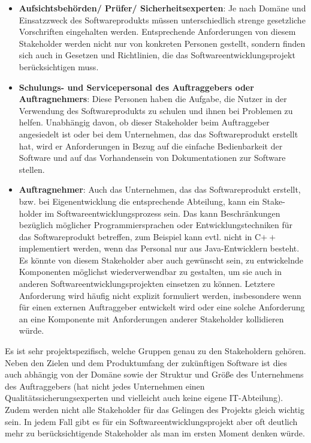 \begin{itemize}
	\item \textbf{Aufsichtsbehörden/ Prüfer/ Sicherheitsexperten}: Je nach Domäne und Einsatzzweck des Softwareprodukts müssen unterschiedlich strenge gesetzliche Vorschriften eingehalten werden. Entsprechende Anforderungen von diesem Stakeholder werden nicht nur von konkreten Personen gestellt, sondern finden sich auch in Gesetzen und Richtlinien, die das Softwareentwicklungsprojekt berücksichtigen muss.
	\item \textbf{Schulungs- und Servicepersonal des Auftraggebers oder Auftrag\-nehmers}: Diese Personen haben die Aufgabe, die Nutzer in der Verwendung des Softwareprodukts zu schulen und ihnen bei Problemen zu helfen. Unabhängig davon, ob dieser Stakeholder beim Auftraggeber angesiedelt ist oder bei dem Unternehmen, das das Softwareprodukt erstellt hat, wird er Anforderungen in Bezug auf die einfache Bedienbarkeit der Software und auf das Vorhandensein von Dokumentationen zur Software stellen.
	\item \textbf{Auftragnehmer}: Auch das Unternehmen, das das Softwareprodukt erstellt, bzw. bei Eigenentwicklung die entsprechende Abteilung, kann ein 
	Stake- \linebreak %
	holder im Softwareentwicklungsprozess sein. Das kann Beschränkungen bezüglich möglicher Programmiersprachen oder Entwicklungstechniken für das Software\-produkt betreffen, zum Beispiel kann evtl. nicht in C$++$ implementiert werden, wenn das Personal nur aus Java-Entwicklern besteht. Es könnte von diesem Stakeholder aber auch gewünscht sein, zu entwickelnde Komponenten möglichst wiederverwendbar zu gestalten, um sie auch in anderen Softwareentwicklungsprojekten einsetzen zu können. Letztere Anforderung wird häufig nicht explizit formuliert werden, insbesondere wenn für einen externen Auftraggeber entwickelt wird oder eine solche Anforderung an eine Komponente mit Anforderungen anderer Stakeholder kollidieren würde.
\end{itemize}

Es ist sehr projektspezifisch, welche Gruppen genau zu den Stakeholdern gehören. Neben den Zielen und dem Produktumfang der zukünftigen Software ist dies auch abhängig von der Domäne sowie der Struktur und Größe des Unternehmens des Auftraggebers (\zb hat nicht jedes Unternehmen einen Qualitätssicherungsexperten und vielleicht auch keine eigene IT-Abteilung). Zudem werden nicht alle Stakeholder für das Gelingen des Projekts gleich wichtig sein. In jedem Fall gibt es für ein Softwareentwicklungsprojekt aber oft deutlich mehr zu berücksichtigende Stakeholder als man im ersten Moment denken würde.

